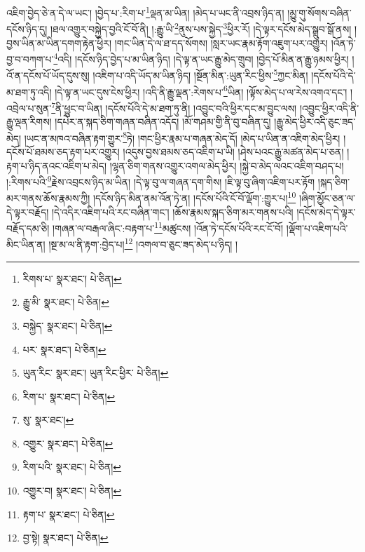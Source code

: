 འཇིག་བྱེད་ཅེ་ན་དེ་ལ་ཡང་། །བྱེད་པ་:རིག་པ་\footnote{རིགས་པ་  སྣར་ཐང་།  པེ་ཅིན། }ལྡན་མ་ཡིན། །མེད་པ་ཡང་ནི་འབྲས་ཉིད་ན། །མྱུ་གུ་སོགས་བཞིན་དངོས་ཉིད་དུ། །ཐལ་འགྱུར་བསྐྱེད་བྱའི་ངོ་བོ་ནི། །:རྒྱུ་ཡི་\footnote{རྒྱུ་མི་  སྣར་ཐང་།  པེ་ཅིན། }ནུས་པས་སྐྱེད་\footnote{བསྐྱེད་  སྣར་ཐང་།  པེ་ཅིན། }ཕྱིར་རོ། །དེ་ལྟར་དངོས་མེད་སྒྲུབ་སྒོ་ནས། །བྱས་ཡིན་མ་ཡིན་དགག་རྟེན་ཕྱིར། །གང་ཡིན་དེ་ལ་ཐ་དད་སོགས། །སླར་ཡང་རྣམ་རྟོག་འཇུག་པར་འགྱུར། །འོན་ཏེ་བྱ་བ་བཀག་པ་\footnote{པར་  སྣར་ཐང་།  པེ་ཅིན། }འདི། །དངོས་ཉིད་བྱེད་པ་མ་ཡིན་ཉིད། །དེ་ལྟ་ན་ཡང་རྒྱུ་མེད་གྲུབ། །བྱེད་པོ་མིན་ན་རྒྱུ་ཉམས་ཕྱིར། །འོ་ན་དངོས་པོ་ཡོད་དུས་སུ། །འཇིག་པ་འདི་ཡོད་མ་ཡིན་ཉིད། །སྔོན་མིན་:ཡུན་རིང་ཕྱིས་\footnote{ཡུན་རིང་  སྣར་ཐང་། ཡུན་རིང་ཕྱིར་  པེ་ཅིན། }ཀྱང་མིན། །དངོས་པོའི་དེ་མ་ཐག་ཏུ་འདི། །དེ་ལྟ་ན་ཡང་དུས་ངེས་ཕྱིར། །འདི་ནི་རྒྱུ་ལྡན་:རེགས་པ་\footnote{རིག་པ་  སྣར་ཐང་།  པེ་ཅིན། }ཡིན། །ལྟོས་མེད་པ་ལ་རེས་འགའ་དང་། །འབྲེལ་པ་སུན་\footnote{སུ་  སྣར་ཐང་། }ནི་ཕྱུང་བ་ཡིན། །དངོས་པོའི་དེ་མ་ཐག་ཏུ་ནི། །འབྱུང་བའི་ཕྱིར་དང་མ་བྱུང་ལས། །འབྱུང་ཕྱིར་འདི་ནི་རྒྱུ་ལྡན་རིགས། །དཔེར་ན་སྐད་ཅིག་གཞན་བཞིན་འདོད། །མོ་གཤམ་གྱི་ནི་བུ་བཞིན་དུ། །རྒྱུ་མེད་ཕྱིར་འདི་ཅུང་ཟད་མེད། །ཡང་ན་མཁའ་བཞིན་རྟག་གྱུར་\footnote{འགྱུར་  སྣར་ཐང་།  པེ་ཅིན། }ཏེ། །གང་ཕྱིར་རྣམ་པ་གཞན་མེད་དོ། །མེད་པ་ཡིན་ན་འཇིག་མེད་ཕྱིར། །དངོས་པོ་ཐམས་ཅད་རྟག་པར་འགྱུར། །འདུས་བྱས་ཐམས་ཅད་འཇིག་པ་ཡི། །ཤེས་པའང་རྒྱུ་མཚན་མེད་པ་ཅན། །རྟག་པ་ཉིད་ནའང་འཇིག་པ་མེད། །ལྷན་ཅིག་གནས་འགྱུར་འགལ་མེད་ཕྱིར། །སྐྱེ་བ་མེད་ལའང་འཇིག་བཤད་པ། །:རིགས་པའི་\footnote{རིག་པའི་  སྣར་ཐང་།  པེ་ཅིན། }རྗེས་འབྲངས་ཉིད་མ་ཡིན། །དེ་ལྟ་བུ་ལ་གཞན་དག་གིས། །ཇི་ལྟ་བུ་ཞིག་འཇིག་པར་རྟོག །སྐད་ཅིག་མར་གནས་ཆོས་རྣམས་ཀྱི། །དངོས་ཉིད་མིན་ནམ་འོན་ཏེ་ན། །དངོས་པོའི་ངོ་བོ་ལྡོག་:གྱུར་པ།\footnote{འགྱུར་བ།  སྣར་ཐང་།  པེ་ཅིན། } །ཞིག་མྱོང་ཅན་ལ་དེ་ལྟར་བརྗོད། །དེ་འདིར་འཇིག་པའི་རང་བཞིན་གང་། །ཆོས་རྣམས་སྐད་ཅིག་མར་གནས་པའི། །དངོས་མེད་དེ་ལྟར་བརྗོད་དམ་ཅི། །གཞན་ལ་བརྒལ་ཞིང་:བརྟག་པ་\footnote{རྟག་པ་  སྣར་ཐང་།  པེ་ཅིན། }མཚུངས། །འོན་ཏེ་དངོས་པོའི་རང་ངོ་བོ། །ལྡོག་པ་འཇིག་པའི་མིང་ཡིན་ན། །སྔ་མ་ལ་ནི་རྟག་:བྱེད་པ།\footnote{བྱ་སྟེ།  སྣར་ཐང་།  པེ་ཅིན། } །འགལ་བ་ཅུང་ཟད་མེད་པ་ཉིད། །
